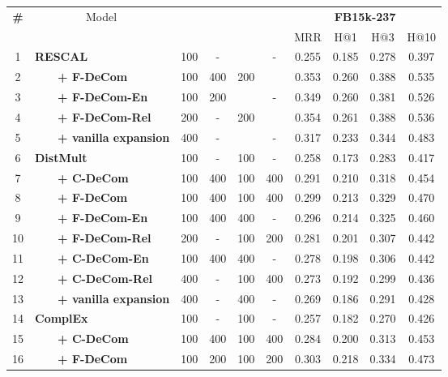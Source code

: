 \documentclass[letterpaper]{article} \usepackage{aaai20}  \usepackage{times}  \usepackage{helvet} \usepackage{courier}  \usepackage{booktabs}
\begin{document}
\begin{table*}[t]
    \centering
    \begin{tabular}{|c|l|cccc|cccc|}
    \toprule
        \multirow{2}{*}{\bf \#}&\multirow{2}{*}{~~~~~~~~~Model} & \multirow{2}{*}{} &
        \multirow{2}{*}{} &
        \multirow{2}{*}{} &
        \multirow{2}{*}{} &
        \multicolumn{4}{|c|}{\textbf{FB15k-237}}   \\
       &  & & & & &  MRR & H@1 & H@3&  H@10\\
         \midrule
         1 & \textbf{RESCAL} & 100 & - &  & - & 0.255 & 0.185 & 0.278 & 0.397 \\
         2 & ~~~~\textbf{+ F-DeCom} & 100 & 400 & 200 &  & 0.353 & 0.260 & 0.388 & 0.535\\
         3 &~~~~\textbf{+ F-DeCom-En} & 100 & 200 &  & - & 0.349 & 0.260 & 0.381 & 0.526\\
         4 &~~~~\textbf{+ F-DeCom-Rel} & 200 & - & 200 &  & 0.354 & 0.261 & 0.388 & 0.536 \\
         5 &~~~~\textbf{+ vanilla expansion} & 400 & - &  & - & 0.317 & 0.233 & 0.344 & 0.483\\
         \midrule
         6 &\textbf{DistMult} & 100 & - & 100 & - &0.258 & 0.173 & 0.283 & 0.417\\
         7 &~~~~\textbf{+ C-DeCom} & 100 & 400 & 100 & 400 & 0.291 & 0.210 & 0.318 & 0.454\\
         8 &~~~~\textbf{+ F-DeCom} & 100 & 400 & 100 & 400 & 0.299 & 0.213 & 0.329 & 0.470\\
         9 &~~~~\textbf{+ F-DeCom-En} & 100 & 400 & 400 & - & 0.296 & 0.214 & 0.325 & 0.460\\
         10 &~~~~\textbf{+ F-DeCom-Rel} & 200 & - & 100 & 200 & 0.281 & 0.201 & 0.307 & 0.442\\
         11 &~~~~\textbf{+ C-DeCom-En} & 100 & 400 & 400 & - & 0.278 & 0.198 & 0.306 & 0.442\\
         12 &~~~~\textbf{+ C-DeCom-Rel} & 400 & - & 100 & 400 & 0.273 & 0.192 & 0.299 & 0.436\\
         13 &~~~~\textbf{+ vanilla expansion} & 400 & - & 400 & - & 0.269 & 0.186 & 0.291 & 0.428\\
         \midrule
         14 &\textbf{ComplEx} & 100 & - & 100 & - & 0.257 & 0.182 & 0.270& 0.426\\
         15 &~~~~\textbf{+ C-DeCom} & 100 & 400 & 100 & 400 & 0.284& 0.200& 0.313&  0.453\\
         16 &~~~~\textbf{+ F-DeCom} & 100 & 200 & 100 & 200 & 0.303 & 0.218 & 0.334 & 0.473\\

\end{tabular}
\end{table*}
\end{document}
